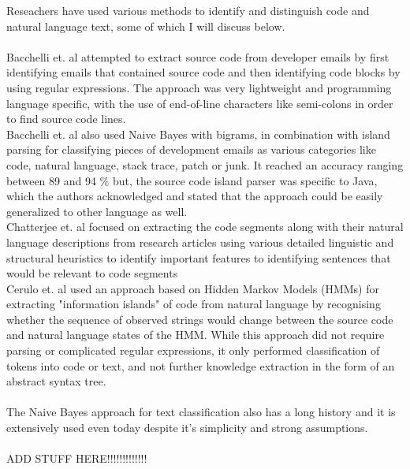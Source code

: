 \documentclass[12pt]{scrreprt}
\begin{document}
Reseachers have used various methods to identify and distinguish code and natural language text, some of which I will discuss below. \\
\\ Bacchelli et. al \cite{bachemail} attempted to extract source code from developer emails by first identifying emails that contained source code and then identifying code blocks by using regular expressions. The approach was very lightweight and programming language specific, with the use of end-of-line characters like semi-colons in order to find source code lines. \\ Bacchelli et. al \cite{bachcontent} also used Naive Bayes with bigrams, in combination with island parsing for classifying pieces of development emails as various categories like code, natural language, stack trace, patch or junk. It reached an accuracy ranging between 89 and 94 \% but, the source code island parser was specific to Java, which the authors acknowledged and stated that the approach could be easily generalized to other language as well. \\ Chatterjee et. al \cite{chattter} focused on extracting the code segments along with their natural language descriptions from research articles using various detailed linguistic and structural heuristics to identify important features to identifying sentences that would be relevant to code segments \\ Cerulo et. al \cite{cerulohmm} used an approach based on Hidden Markov Models (HMMs) for extracting "information islands" of code from natural language by recognising whether the sequence of observed strings would change between the source code and natural language states of the HMM. While this approach did not require parsing or complicated regular expressions, it only performed classification of tokens into code or text, and not further knowledge extraction in the form of an abstract syntax tree.\\
\\ The Naive Bayes approach for text classification also has a long history and it is extensively used even today despite it's simplicity and strong assumptions. \\
\\ ADD STUFF HERE!!!!!!!!!!!!!
\end{document}
